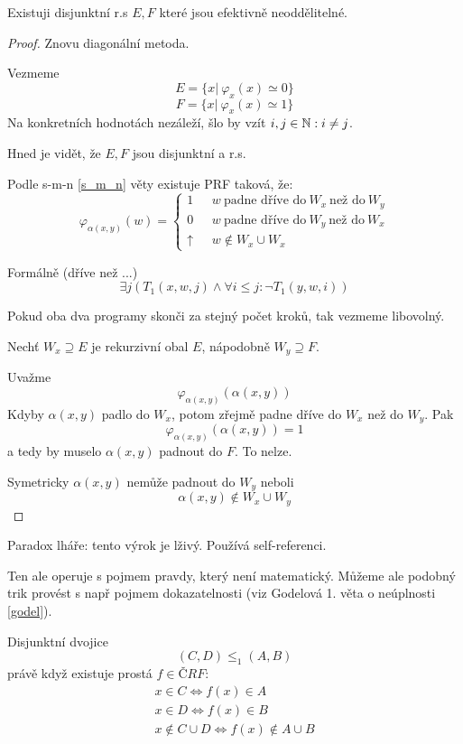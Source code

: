 \begin{theorem}
	Existuji disjunktní r.s $E, F$ které jsou efektivně neoddělitelné.
\end{theorem}
\begin{proof}
	Znovu diagonální metoda.

	Vezmeme
	\[ E = \{ x|\ \varphi_x(x) \simeq 0 \} \]
	\[ F = \{ x|\ \varphi_x(x) \simeq 1 \} \]
	Na konkretních hodnotách nezáleží, šlo by vzít $i, j \in \operatorname{\mathbb{N}}: i \ne j$.

	Hned je vidět, že $E, F$ jsou disjunktní a r.s.

	Podle s-m-n \cref{s_m_n} věty existuje PRF taková, že:
	\[ \varphi_{\alpha(x, y)} (w) =
		\left\{
		\begin{array}{lll}
			1 & \mbox{ } w \ \text{padne dříve do} \ W_x \ \text{než do} \ W_y \\
			0 & \mbox{ } w \ \text{padne dříve do} \ W_y \ \text{než do} \ W_x \\
			\uparrow & \mbox{ } w \notin W_x \cup W_x
		\end{array}
		\right.
	\]

	Formálně (dříve než ...)
	\[ \exists j (T_1(x, w, j) \land \forall i \leq j: \neg T_1(y, w, i)) \]

	Pokud oba dva programy skonči za stejný počet kroků, tak vezmeme libovolný.

	Nechť $W_x \supseteq E$ je rekurzivní obal $E$, nápodobně $W_y \supseteq F$.

	Uvažme
	\[ \varphi_{\alpha(x, y)}(\alpha(x, y)) \]
	Kdyby $\alpha(x, y)$ padlo do $W_x$, potom zřejmě padne dříve do $W_x$ než do $W_y$.
	Pak
	\[ \varphi_{\alpha(x, y)}(\alpha(x, y)) = 1 \]
	a tedy by muselo $\alpha(x, y)$ padnout do $F$. To nelze.

	Symetricky $\alpha(x, y)$ nemůže padnout do $W_y$ neboli
	\[ \alpha(x, y) \notin W_x \cup W_y \]

\end{proof}

\begin{note}
	Paradox lháře: tento výrok je lživý.
	Používá self-referenci.

	Ten ale operuje s pojmem pravdy, který není matematický.
	Můžeme ale podobný trik provést s např pojmem dokazatelnosti (viz Godelová 1. věta o neúplnosti \cref{godel}).
\end{note}

\begin{definition}
	Disjunktní dvojice
	\[ (C, D) \leq_1 (A, B) \]
	právě když existuje prostá $f \in ČRF$:
	\begin{gather*}
		x \in C \iff f(x) \in A\\
		x \in D \iff f(x) \in B\\
		x \notin C \cup D \iff f(x) \notin A \cup B
	\end{gather*}
\end{definition}

